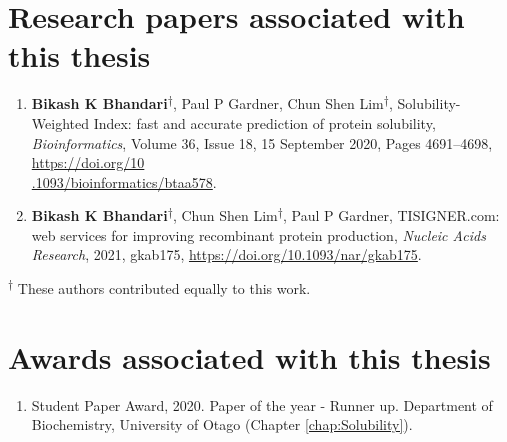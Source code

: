 \section*{Research papers associated with this thesis}
\begin{enumerate}
	\item \textbf{Bikash K Bhandari}\textsuperscript{$\dagger$}, Paul P Gardner, Chun Shen Lim\textsuperscript{$\dagger$}, Solubility-Weighted Index: fast and accurate prediction of protein solubility, \textit{Bioinformatics}, Volume 36, Issue 18, 15 September 2020, Pages 4691–4698, \href{https://doi.org/10.1093/bioinformatics/btaa578}{https://doi.org/10\\.1093/bioinformatics/btaa578}.
	
	
	\item \textbf{Bikash K Bhandari}\textsuperscript{$\dagger$}, Chun Shen Lim\textsuperscript{$\dagger$}, Paul P Gardner, TISIGNER.com: web services for improving recombinant protein production, \textit{Nucleic Acids Research}, 2021, gkab175, \href{https://doi.org/10.1093/nar/gkab175}{https://doi.org/10.1093/nar/gkab175}.
	
\end{enumerate}

\textsuperscript{$\dagger$} These authors contributed equally to this work.



\section*{Awards associated with this thesis}
\begin{enumerate}
	\item Student Paper Award, 2020. Paper of the year - Runner up. Department of Biochemistry, University of Otago (Chapter \ref{chap:Solubility}).

\end{enumerate}